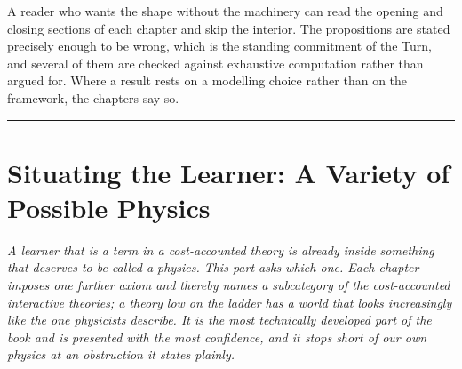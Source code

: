 \documentclass[12pt,openright,twoside]{book}
\theoremstyle{remark}
\theoremstyle{plain}
\theoremstyle{remark}
\theoremstyle{plain}
\theoremstyle{plain}
\begin{document}
A reader who wants the shape without the machinery can read the opening and
closing sections of each chapter and skip the interior.
The propositions are stated precisely enough to be wrong, which is the
standing commitment of the Turn, and several of them are checked against
exhaustive computation rather than argued for.
Where a result rests on a modelling choice rather than on the framework, the
chapters say so.

\bigskip
\noindent\hrule
\bigskip


\part{Situating the Learner: A Variety of Possible Physics}
\label{part:physics}

\vspace{1em}
\begin{mdframed}[backgroundcolor=remarkgray, linecolor=gray!60,
                 linewidth=1pt, topline=false, rightline=false,
                 bottomline=false]
\small\itshape
A learner that is a term in a cost-accounted theory is already inside
something that deserves to be called a physics.
This part asks which one.
Each chapter imposes one further axiom and thereby names a subcategory of
the cost-accounted interactive theories; a theory low on the ladder has a
world that looks increasingly like the one physicists describe.
It is the most technically developed part of the book and is presented
with the most confidence, and it stops short of our own physics at an
obstruction it states plainly.
\end{mdframed}

\bigskip

\end{document}
